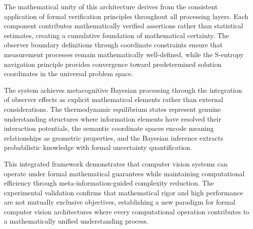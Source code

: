 The mathematical unity of this architecture derives from the consistent application of formal verification principles throughout all processing layers. Each component contributes mathematically verified assertions rather than statistical estimates, creating a cumulative foundation of mathematical certainty. The observer boundary definitions through coordinate constraints ensure that measurement processes remain mathematically well-defined, while the S-entropy navigation principle provides convergence toward predetermined solution coordinates in the universal problem space.

The system achieves metacognitive Bayesian processing through the integration of observer effects as explicit mathematical elements rather than external considerations. The thermodynamic equilibrium states represent genuine understanding structures where information elements have resolved their interaction potentials, the semantic coordinate spaces encode meaning relationships as geometric properties, and the Bayesian inference extracts probabilistic knowledge with formal uncertainty quantification.

This integrated framework demonstrates that computer vision systems can operate under formal mathematical guarantees while maintaining computational efficiency through meta-information-guided complexity reduction. The experimental validation confirms that mathematical rigor and high performance are not mutually exclusive objectives, establishing a new paradigm for formal computer vision architectures where every computational operation contributes to a mathematically unified understanding process.

